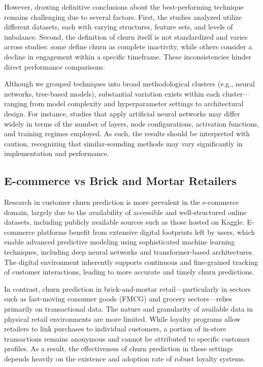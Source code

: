 \documentclass[preprint,12pt]{elsarticle}
\begin{document}
However, drawing definitive conclusions about the best-performing technique remains challenging due to several factors. First, the studies analyzed utilize different datasets, each with varying structures, feature sets, and levels of imbalance. Second, the definition of churn itself is not standardized and varies across studies: some define churn as complete inactivity, while others consider a decline in engagement within a specific timeframe. These inconsistencies hinder direct performance comparisons.

Although we grouped techniques into broad methodological clusters (e.g., neural networks, tree-based models), substantial variation exists within each cluster—ranging from model complexity and hyperparameter settings to architectural design. 
For instance, studies that apply artificial neural networks may differ widely in terms of the number of layers, node configurations, activation functions, and training regimes employed. As such, the results should be interpreted with caution, recognizing that similar-sounding methods may vary significantly in implementation and performance.


\subsection{E-commerce vs Brick and Mortar Retailers}\nopagebreak
\noindent Research in customer churn prediction is more prevalent in the e-commerce domain, largely due to the availability of accessible and well-structured online datasets, including publicly available sources such as those hosted on Kaggle. E-commerce platforms benefit from extensive digital footprints left by users, which enable advanced predictive modeling using sophisticated machine learning techniques, including deep neural networks and transformer-based architectures. The digital environment inherently supports continuous and fine-grained tracking of customer interactions, leading to more accurate and timely churn predictions.

In contrast, churn prediction in brick-and-mortar retail---particularly in sectors such as fast-moving consumer goods (FMCG) and grocery sectors---relies primarily on transactional data. The nature and granularity of available data in physical retail environments are more limited. While loyalty programs allow retailers to link purchases to individual customers, a portion of in-store transactions remains anonymous and cannot be attributed to specific customer profiles. As a result, the effectiveness of churn prediction in these settings depends heavily on the existence and adoption rate of robust loyalty systems.
\end{document}
